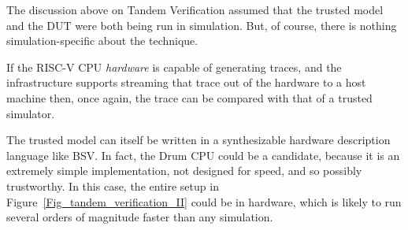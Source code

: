 The discussion above on Tandem Verification assumed that the trusted
model and the DUT were both being run in simulation.  But, of course,
there is nothing simulation-specific about the technique.

If the RISC-V CPU \emph{hardware} is capable of generating traces, and
the infrastructure supports streaming that trace out of the hardware
to a host machine then, once again, the trace can be compared with
that of a trusted simulator.

The trusted model can itself be written in a synthesizable hardware
description language like BSV.  In fact, the Drum CPU could be a
candidate, because it is an extremely simple implementation, not
designed for speed, and so possibly trustworthy.  In this case, the
entire setup in Figure~\ref{Fig_tandem_verification_II} could be in
hardware, which is likely to run several orders of magnitude faster
than any simulation.

